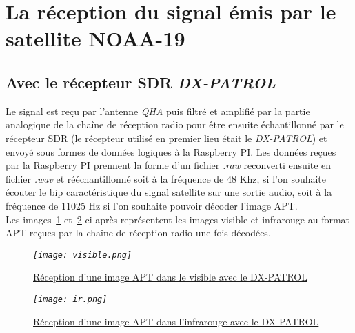 \documentclass[12pt,fleqn]{book} %
\begin{document}
\section{La réception du signal émis par le satellite NOAA-19}
\subsection{Avec le récepteur SDR \emph{DX-PATROL}}
Le signal est reçu par l'antenne \emph{QHA} puis filtré et amplifié par la partie analogique de la chaîne de réception radio pour être ensuite échantillonné par le récepteur SDR (le récepteur utilisé en premier lieu était le \emph{DX-PATROL}) et envoyé sous formes de données logiques à la Raspberry PI. Les données reçues par la Raspberry PI prennent la forme d'un fichier \emph{.raw} reconverti ensuite en fichier \emph{.wav} et rééchantillonné soit à la fréquence de 48 Khz, si l'on souhaite écouter le bip caractéristique du signal satellite sur une sortie audio, soit à la fréquence de 11025 Hz si l'on souhaite pouvoir décoder l'image APT.
~\\Les images~\underline{\color{blue}\ref{visible}} et~\underline{\color{blue}\ref{ir}} ci-après représentent les images visible et infrarouge au format APT reçues par la chaîne de réception radio une fois décodées.
\begin{figure}[H]
	\centering
	\itshape
	\texttt{[image: visible.png]}
	\caption{\label{visible} \underline{Réception d'une image APT dans le visible avec le DX-PATROL}}
\end{figure}
\begin{figure}[H]
	\centering
	\itshape
	\texttt{[image: ir.png]}
	\caption{\label{ir} \underline{Réception d'une image APT dans l'infrarouge avec le DX-PATROL}}
\end{figure}
\end{document}
